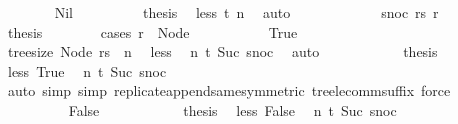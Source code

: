 \begin{isabellebody}
\ \ \ \ \ \ \isamarkupfalse%
\ Nil\isanewline
\ \ \ \ \ \ \isamarkupfalse%
\ \isamarkupfalse%
\ {\isacharquery}{\kern0pt}thesis\ \isamarkupfalse%
\ less\ t\ n\ \isamarkupfalse%
\ auto\isanewline
\ \ \ \ \isamarkupfalse%
\isanewline
\ \ \ \ \ \ \isamarkupfalse%
\ {\isacharparenleft}{\kern0pt}snoc\ rs\ r{\isacharparenright}{\kern0pt}\isanewline
\ \ \ \ \ \ \isamarkupfalse%
\ \isamarkupfalse%
\ {\isacharquery}{\kern0pt}thesis\isanewline
\ \ \ \ \ \ \isamarkupfalse%
\ {\isacharparenleft}{\kern0pt}cases\ {\isachardoublequoteopen}r\ {\isacharequal}{\kern0pt}\ Node\ {\isacharbrackleft}{\kern0pt}{\isacharbrackright}{\kern0pt}{\isachardoublequoteclose}{\isacharparenright}{\kern0pt}\isanewline
\ \ \ \ \ \ \ \ \isamarkupfalse%
\ True\isanewline
\ \ \ \ \ \ \ \ \isamarkupfalse%
\ \isamarkupfalse%
\ {\isachardoublequoteopen}tree{\isacharunderscore}{\kern0pt}size\ {\isacharparenleft}{\kern0pt}Node\ rs{\isacharparenright}{\kern0pt}\ {\isasymge}\ n{\isacharprime}{\kern0pt}{\isacharprime}{\kern0pt}{\isachardoublequoteclose}\ \isamarkupfalse%
\ less{\isacharparenleft}{\kern0pt}{}{\isacharparenright}{\kern0pt}\ \isamarkupfalse%
\ n\ t\ Suc\ snoc\ \isamarkupfalse%
\ auto\isanewline
\ \ \ \ \ \ \ \ \isamarkupfalse%
\ \isamarkupfalse%
\ {\isacharquery}{\kern0pt}thesis\ \isamarkupfalse%
\ less\ True\ \isamarkupfalse%
\ n\ t\ Suc\ snoc\isanewline
\ \ \ \ \ \ \ \ \ \ \isamarkupfalse%
\ {\isacharparenleft}{\kern0pt}auto\ simp{\isacharcolon}{\kern0pt}\ simp{\isacharcolon}{\kern0pt}\ replicate{\isacharunderscore}{\kern0pt}append{\isacharunderscore}{\kern0pt}same{\isacharbrackleft}{\kern0pt}symmetric{\isacharbrackright}{\kern0pt}\ tree{\isacharunderscore}{\kern0pt}le{\isacharunderscore}{\kern0pt}comm{\isacharunderscore}{\kern0pt}suffix{\isacharcomma}{\kern0pt}\ force{\isacharparenright}{\kern0pt}\isanewline
\ \ \ \ \ \ \isamarkupfalse%
\isanewline
\ \ \ \ \ \ \ \ \isamarkupfalse%
\ False\isanewline
\ \ \ \ \ \ \ \ \isamarkupfalse%
\ \isamarkupfalse%
\ {\isacharquery}{\kern0pt}thesis\ \isamarkupfalse%
\ less\ False\ \isamarkupfalse%
\ n\ t\ Suc\ snoc\isanewline
\ \ \ \ \ \ \ \ \ \ \isamarkupfalse%

\end{isabellebody}
